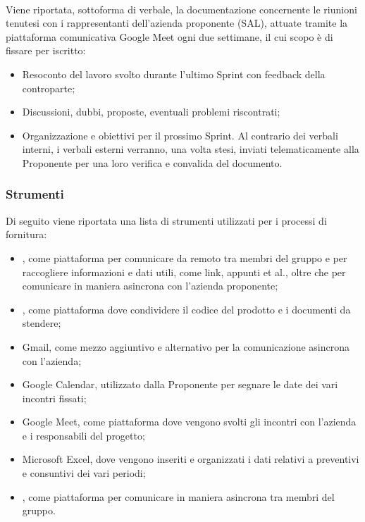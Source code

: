 \\
Viene riportata, sottoforma di verbale, la documentazione concernente le riunioni tenutesi con i rappresentanti dell'azienda proponente (SAL), attuate tramite la piattaforma comunicativa Google Meet ogni due settimane, il cui scopo è di fissare per iscritto:
\begin{itemize}
    \item Resoconto del lavoro svolto durante l'ultimo Sprint con feedback della controparte;
    \item Discussioni, dubbi, proposte, eventuali problemi riscontrati;
    \item Organizzazione e obiettivi per il prossimo Sprint.
Al contrario dei verbali interni, i verbali esterni verranno, una volta stesi, inviati telematicamente alla Proponente per una loro verifica e convalida del documento.
\end{itemize} 

\subsubsection{Strumenti}
Di seguito viene riportata una lista di strumenti utilizzati per i processi di fornitura:
\begin{itemize}
    \item {}, come piattaforma per comunicare da remoto tra membri del gruppo e per raccogliere informazioni e dati utili, come link, appunti et al., oltre che per comunicare in maniera asincrona con l'azienda proponente;
    \item {}, come piattaforma dove condividere il codice del prodotto e i documenti da stendere;
    \item Gmail, come mezzo aggiuntivo e alternativo per la comunicazione asincrona con l'azienda;
    \item Google Calendar, utilizzato dalla Proponente per segnare le date dei vari incontri fissati;
    \item Google Meet, come piattaforma dove vengono svolti gli incontri con l'azienda e i responsabili del progetto; 
    \item Microsoft Excel, dove vengono inseriti e organizzati i dati relativi a preventivi e consuntivi dei vari periodi; 
    \item {}, come piattaforma per comunicare in maniera asincrona tra membri del gruppo. 
\end{itemize}
